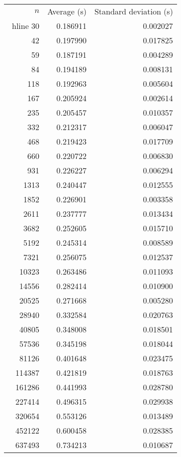 \begin{tabular}{rrr}
$n$& Average (s) & Standard deviation (s)\\\ hline
30& 0.186911& 0.002027\\
42& 0.197990& 0.017825\\
59& 0.187191& 0.004289\\
84& 0.194189& 0.008131\\
118& 0.192963& 0.005604\\
167& 0.205924& 0.002614\\
235& 0.205457& 0.010357\\
332& 0.212317& 0.006047\\
468& 0.219423& 0.017709\\
660& 0.220722& 0.006830\\
931& 0.226227& 0.006294\\
1313& 0.240447& 0.012555\\
1852& 0.226901& 0.003358\\
2611& 0.237777& 0.013434\\
3682& 0.252605& 0.015710\\
5192& 0.245314& 0.008589\\
7321& 0.256075& 0.012537\\
10323& 0.263486& 0.011093\\
14556& 0.282414& 0.010900\\
20525& 0.271668& 0.005280\\
28940& 0.332584& 0.020763\\
40805& 0.348008& 0.018501\\
57536& 0.345198& 0.018044\\
81126& 0.401648& 0.023475\\
114387& 0.421819& 0.018763\\
161286& 0.441993& 0.028780\\
227414& 0.496315& 0.029938\\
320654& 0.553126& 0.013489\\
452122& 0.600458& 0.028385\\
637493& 0.734213& 0.010687\\
\end{tabular}
